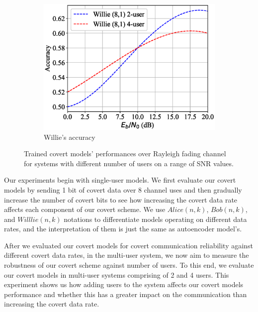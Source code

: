 \begin{figure}[tp!]
\begin{subfigure}{0.28\textwidth}
		\includegraphics[width=\linewidth]{figs/multi_willie_accuracy_rayleigh}
		\caption{Willie's accuracy}
		\label{fig:multi_rayleigh_results_willie}
	\end{subfigure}
	\caption{Trained covert models' performances over Rayleigh fading channel for systems with different number of users on a range of SNR values.}
	\label{fig:multi_rayleigh_results}
\end{figure}

Our experiments begin with single-user models. We first evaluate our covert models by sending 1 bit of covert data over 8 channel uses and then gradually increase the number of covert bits to see how increasing the covert data rate affects each component of our covert scheme. We use \(Alice (n,k)\), \(Bob (n,k)\), and \(Willlie (n,k)\) notations to differentiate models operating on different data rates, and the interpretation of them is just the same as autoencoder model's. 

After we evaluated our covert models for covert communication reliability against different covert data rates, in the multi-user system, we now aim to measure the robustness of our covert scheme against number of users. To this end, we evaluate our covert models in multi-user systems comprising of 2 and 4 users. This experiment shows us how adding users to the system affects our covert models performance and whether this has a greater impact on the communication than increasing the covert data rate.

